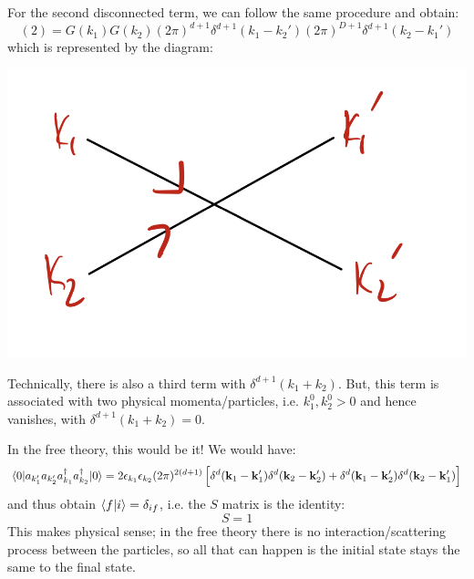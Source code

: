 For the second disconnected term, we can follow the same procedure and obtain:
\begin{equation}
    (2) = G(k_1)G(k_2)(2\pi)^{d+1}\delta^{d+1}(k_1 - k_2')(2\pi)^{D+1}\delta^{d+1}(k_2 - k_1')
\end{equation}
which is represented by the diagram:

\begin{center}
    \includegraphics[scale=0.35]{Lectures/Figures/lec17-swap.png}
\end{center}

Technically, there is also a third term with $\delta^{d+1}(k_1 + k_2)$. But, this term is associated with two physical momenta/particles, i.e. $k_1^0, k_2^0 > 0$ and hence vanishes, with $\delta^{d+1}(k_1 + k_2) = 0$.

In the free theory, this would be it! We would have:
\begin{equation}
    \langle 0 \rvert a_{k_1'}a_{k_2'}a^\dagger_{k_1}a^\dagger_{k_2}\lvert 0 \rangle = 2\epsilon_{k_1}\epsilon_{k_2}(2\pi)^{2(d+1)}\left[\delta^d(\mathbf{k}_1 - \mathbf{k}_1')\delta^d(\mathbf{k}_2 - \mathbf{k}_2') + \delta^d(\mathbf{k}_1 - \mathbf{k}_2')\delta^d(\mathbf{k}_2 - \mathbf{k}_1')\right]
\end{equation}
and thus obtain $\langle f \lvert i \rangle = \delta_{if}$, i.e. the $S$ matrix is the identity:
\begin{equation}
    S = 1
\end{equation}
This makes physical sense; in the free theory there is no interaction/scattering process between the particles, so all that can happen is the initial state stays the same to the final state.

